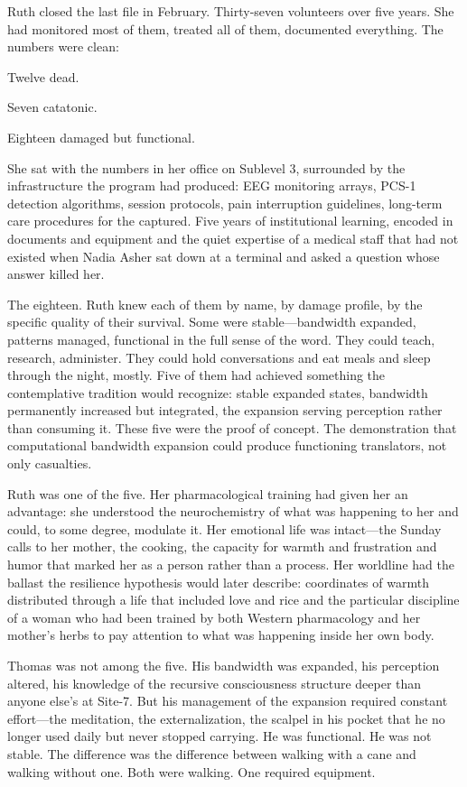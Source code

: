 Ruth closed the last file in February. Thirty-seven volunteers over five years. She had monitored most of them, treated all of them, documented everything. The numbers were clean:

Twelve dead.

Seven catatonic.

Eighteen damaged but functional.

She sat with the numbers in her office on Sublevel 3, surrounded by the infrastructure the program had produced: EEG monitoring arrays, PCS-1 detection algorithms, session protocols, pain interruption guidelines, long-term care procedures for the captured. Five years of institutional learning, encoded in documents and equipment and the quiet expertise of a medical staff that had not existed when Nadia Asher sat down at a terminal and asked a question whose answer killed her.

The eighteen. Ruth knew each of them by name, by damage profile, by the specific quality of their survival. Some were stable---bandwidth expanded, patterns managed, functional in the full sense of the word. They could teach, research, administer. They could hold conversations and eat meals and sleep through the night, mostly. Five of them had achieved something the contemplative tradition would recognize: stable expanded states, bandwidth permanently increased but integrated, the expansion serving perception rather than consuming it. These five were the proof of concept. The demonstration that computational bandwidth expansion could produce functioning translators, not only casualties.

Ruth was one of the five. Her pharmacological training had given her an advantage: she understood the neurochemistry of what was happening to her and could, to some degree, modulate it. Her emotional life was intact---the Sunday calls to her mother, the cooking, the capacity for warmth and frustration and humor that marked her as a person rather than a process. Her worldline had the ballast the resilience hypothesis would later describe: coordinates of warmth distributed through a life that included love and rice and the particular discipline of a woman who had been trained by both Western pharmacology and her mother's herbs to pay attention to what was happening inside her own body.

Thomas was not among the five. His bandwidth was expanded, his perception altered, his knowledge of the recursive consciousness structure deeper than anyone else's at Site-7. But his management of the expansion required constant effort---the meditation, the externalization, the scalpel in his pocket that he no longer used daily but never stopped carrying. He was functional. He was not stable. The difference was the difference between walking with a cane and walking without one. Both were walking. One required equipment.

